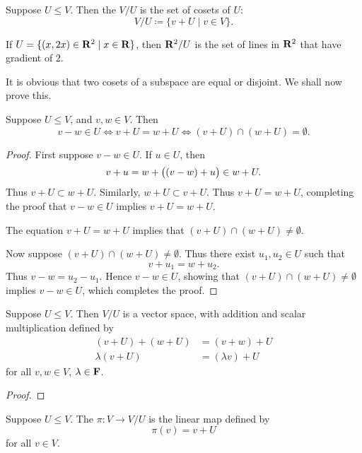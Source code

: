 \begin{definition}
Suppose $U\le V$. Then the  $V/U$ is the set of cosets of $U$:
\[V/U\coloneqq\{v+U\mid v\in V\}.\]
\end{definition}

\begin{example}
If $U=\{(x,2x)\in\mathbf R^2\mid x\in\mathbf R\}$, then $\mathbf R^2/U$ is the set of lines in $\mathbf R^2$ that have gradient of $2$.
\end{example}

It is obvious that two cosets of a subspace are equal or disjoint. We shall now prove this.

\begin{proposition}
Suppose $U\le V$, and $v,w\in V$. Then
\[v-w\in U\iff v+U=w+U\iff(v+U)\cap(w+U)=\emptyset.\]
\end{proposition}

\begin{proof}
First suppose $v-w\in U$. If $u\in U$, then
\[v+u=w+\left((v-w)+u\right)\in w+U.\]
Thus $v+U\subset w+U$. Similarly, $w+U \subset v+U$. Thus $v+U=w+U$, completing the proof that $v-w\in U$ implies $v+U=w+U$.

The equation $v+U=w+U$ implies that $(v+U)\cap(w+U)\neq\emptyset$.

Now suppose $(v+U)\cap(w+U)\neq\emptyset$. Thus there exist $u_1,u_2\in U$ such that
\[v+u_1=w+u_2.\]
Thus $v-w=u_2-u_1$. Hence $v-w\in U$, showing that $(v+U)\cap(w+U)\neq\emptyset$ implies $v-w\in U$, which completes the proof.
\end{proof}

\begin{proposition}
Suppose $U\le V$. Then $V/U$ is a vector space, with addition and scalar multiplication defined by
\begin{align*}
(v+U)+(w+U)&=(v+w)+U\\
\lambda(v+U)&=(\lambda v)+U
\end{align*}
for all $v,w\in V$, $\lambda\in\mathbf F$.
\end{proposition}

\begin{proof}

\end{proof}

\begin{definition}
Suppose $U\le V$. The  $\pi:V\to V/U$ is the linear map defined by
\[\pi(v)=v+U\]
for all $v\in V$.
\end{definition}

